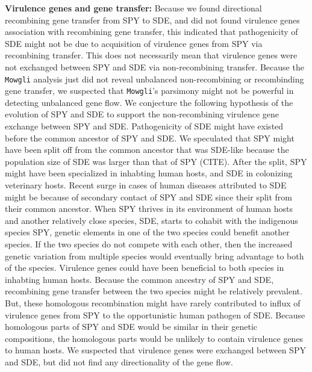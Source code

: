 \documentclass[english]{article}
\begin{document}
\textbf{Virulence genes and gene transfer:} 
Because we found directional recombining gene transfer from SPY to SDE, and did
not found virulence genes association with recombining gene transfer, this
indicated that pathogenicity of SDE might not be due to acquisition of virulence
genes from SPY via recombining transfer. This does not necessarily mean that
virulence genes were not exchanged between SPY and SDE via non-recombining
transfer.  Because the \texttt{Mowgli} analysis just did not reveal unbalanced
non-recombining or recombinding gene transfer, we suspected that \texttt{Mowgli}'s
parsimony might not be powerful in detecting unbalanced gene flow.  We
conjecture the following hypothesis of the evolution of SPY and SDE to support
the non-recombining virulence gene exchange between SPY and SDE.  Pathogenicity
of SDE might have existed before the common ancestor of SPY and SDE.  We
speculated that SPY might have been split off from the common ancestor that was
SDE-like because the population size of SDE was larger than that of SPY (CITE).
After the split, SPY might have been specialized in inhabting human hosts, and
SDE in colonizing veterinary hosts. Recent surge in cases of human diseases
attributed to SDE might be because of secondary contact of SPY and SDE since
their split from their common ancestor.  When SPY thrives in its environment of
human hosts and another relatively close species, SDE, starts to cohabit with
the indigenous species SPY, genetic elements in one of the two species could
benefit another species. If the two species do not compete with each other, then
the increased genetic variation from multiple species would eventually bring
advantage to both of the species.  Virulence genes could have been beneficial to
both species in inhabting human hosts.  Because the common ancestry of SPY and
SDE, recombining gene transfer between the two species might be relatively
prevalent. But, these homologous recombination might have rarely contributed to
influx of virulence genes from SPY to the opportunistic human pathogen of SDE.
Because homologous parts of SPY and SDE would be similar in their genetic
compositions, the homologous parts would be unlikely to contain virulence genes
to human hosts. We suspected that virulence genes were exchanged between SPY and
SDE, but did not find any directionality of the gene flow.
\end{document}
